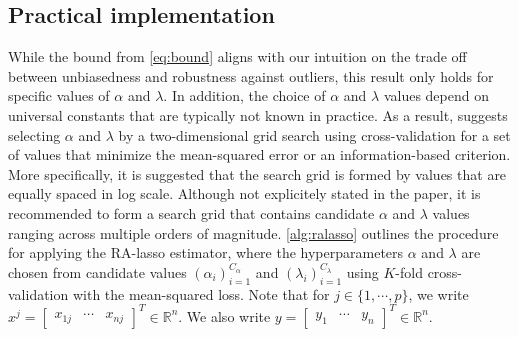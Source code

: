 \subsection{Practical implementation}
While the bound from \cref{eq:bound} aligns with our intuition on the trade off between unbiasedness and robustness against outliers, this result only holds for specific values of $\alpha$ and $\lambda$. In addition, the choice of $\alpha$ and $\lambda$ values depend on universal constants that are typically not known in practice. As a result, \citet{fan2017estimation} suggests selecting $\alpha$ and $\lambda$ by a two-dimensional grid search using cross-validation for a set of values that minimize the mean-squared error or an information-based criterion. More specifically, it is suggested that the search grid is formed by values that are equally spaced in log scale. Although not explicitely stated in the paper, it is recommended to form a search grid that contains candidate $\alpha$ and $\lambda$ values ranging across multiple orders of magnitude. \cref{alg:ralasso} outlines the procedure for applying the RA-lasso estimator, where the hyperparameters $\alpha$ and $\lambda$ are chosen from candidate values $(\alpha_i)_{i=1}^{C_\alpha}$ and $(\lambda_i)_{i=1}^{C_\lambda}$ using $K$-fold cross-validation with the mean-squared loss. Note that for $j\in\{1,\cdots,p\}$, we write $x^j = \begin{bmatrix} x_{1j} & \cdots & x_{nj} \end{bmatrix}^T \in \mathbb{R}^n$. We also write $y = \begin{bmatrix} y_1 & \cdots & y_n \end{bmatrix}^T \in \mathbb{R}^n$.
